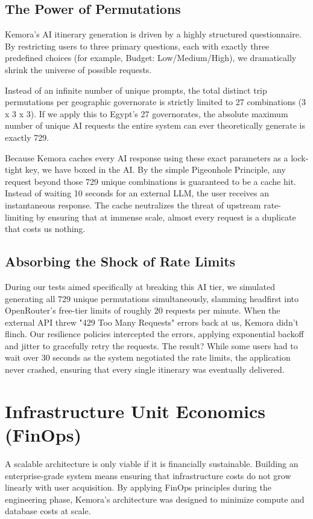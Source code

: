 \subsection{The Power of Permutations}
Kemora's AI itinerary generation is driven by a highly structured questionnaire. By restricting users to three primary questions, each with exactly three predefined choices (for example, Budget: Low/Medium/High), we dramatically shrink the universe of possible requests.

Instead of an infinite number of unique prompts, the total distinct trip permutations per geographic governorate is strictly limited to 27 combinations (3 x 3 x 3). If we apply this to Egypt's 27 governorates, the absolute maximum number of unique AI requests the entire system can ever theoretically generate is exactly 729.

Because Kemora caches every AI response using these exact parameters as a lock-tight key, we have boxed in the AI. By the simple Pigeonhole Principle, any request beyond those 729 unique combinations is guaranteed to be a cache hit. Instead of waiting 10 seconds for an external LLM, the user receives an instantaneous response. The cache neutralizes the threat of upstream rate-limiting by ensuring that at immense scale, almost every request is a duplicate that costs us nothing.

\subsection{Absorbing the Shock of Rate Limits}
During our tests aimed specifically at breaking this AI tier, we simulated generating all 729 unique permutations simultaneously, slamming headfirst into OpenRouter's free-tier limits of roughly 20 requests per minute. When the external API threw "429 Too Many Requests" errors back at us, Kemora didn't flinch. Our resilience policies intercepted the errors, applying exponential backoff and jitter to gracefully retry the requests. The result? While some users had to wait over 30 seconds as the system negotiated the rate limits, the application never crashed, ensuring that every single itinerary was eventually delivered.

\section{Infrastructure Unit Economics (FinOps)}
A scalable architecture is only viable if it is financially sustainable. Building an enterprise-grade system means ensuring that infrastructure costs do not grow linearly with user acquisition. By applying FinOps principles during the engineering phase, Kemora's architecture was designed to minimize compute and database costs at scale.

